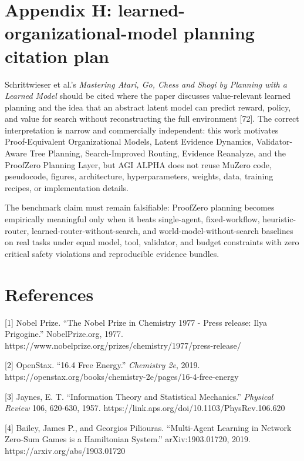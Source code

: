 \documentclass[11pt]{article}
\begin{document}
\section{Appendix H: learned-organizational-model planning citation
plan}\label{appendix-h-learned-organizational-model-planning-citation-plan}

Schrittwieser et al.'s \emph{Mastering Atari, Go, Chess and Shogi by
Planning with a Learned Model} should be cited where the paper discusses
value-relevant learned planning and the idea that an abstract latent
model can predict reward, policy, and value for search without
reconstructing the full environment {[}72{]}. The correct interpretation
is narrow and commercially independent: this work motivates
Proof-Equivalent Organizational Models, Latent Evidence Dynamics,
Validator-Aware Tree Planning, Search-Improved Routing, Evidence
Reanalyze, and the ProofZero Planning Layer, but AGI ALPHA does not
reuse MuZero code, pseudocode, figures, architecture, hyperparameters,
weights, data, training recipes, or implementation details.

The benchmark claim must remain falsifiable: ProofZero planning becomes
empirically meaningful only when it beats single-agent, fixed-workflow,
heuristic-router, learned-router-without-search, and
world-model-without-search baselines on real tasks under equal model,
tool, validator, and budget constraints with zero critical safety
violations and reproducible evidence bundles.

\section{References}\label{references}
\begingroup\small\sloppy

{[}1{]} Nobel Prize. ``The Nobel Prize in Chemistry 1977 - Press
release: Ilya Prigogine.'' NobelPrize.org, 1977.
https://www.nobelprize.org/prizes/chemistry/1977/press-release/

{[}2{]} OpenStax. ``16.4 Free Energy.'' \emph{Chemistry 2e}, 2019.
https://openstax.org/books/chemistry-2e/pages/16-4-free-energy

{[}3{]} Jaynes, E. T. ``Information Theory and Statistical Mechanics.''
\emph{Physical Review} 106, 620-630, 1957.
https://link.aps.org/doi/10.1103/PhysRev.106.620

{[}4{]} Bailey, James P., and Georgios Piliouras. ``Multi-Agent Learning
in Network Zero-Sum Games is a Hamiltonian System.'' arXiv:1903.01720,
2019. https://arxiv.org/abs/1903.01720
\end{document}
